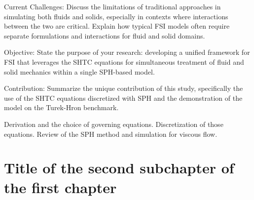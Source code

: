     Current Challenges: Discuss the limitations of traditional approaches in simulating both fluids and solids,
    especially in contexts where interactions between the two are critical. Explain how typical FSI models often require
     separate formulations and interactions for fluid and solid domains.

    Objective: State the purpose of your research: developing a unified framework for FSI that leverages the SHTC
    equations for simultaneous treatment of fluid and solid mechanics within a single SPH-based model.

    Contribution: Summarize the unique contribution of this study, specifically the use of the SHTC
    equations discretized with SPH and the demonstration of the model on the Turek-Hron benchmark.



Derivation and the choice of governing equations. Discretization of those equations.
Review of the SPH method and simulation for viscous flow. 
\section{Title of the second subchapter of the first chapter}
